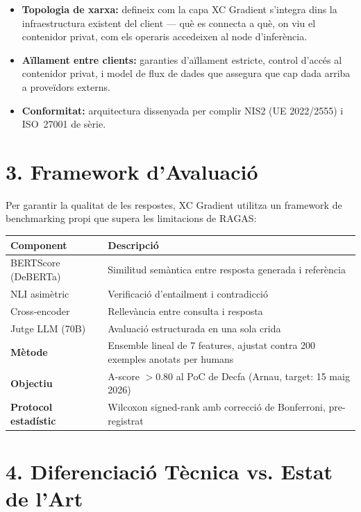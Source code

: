 \documentclass[11pt,a4paper]{article}
\begin{document}
\begin{itemize}[leftmargin=1.5em,itemsep=2pt]
\item \textbf{Topologia de xarxa:} defineix com la capa XC Gradient s'integra dins la infraestructura existent del client --- què es connecta a què, on viu el contenidor privat, com els operaris accedeixen al node d'inferència.
\item \textbf{Aïllament entre clients:} garanties d'aïllament estricte, control d'accés al contenidor privat, i model de flux de dades que assegura que cap dada arriba a proveïdors externs.
\item \textbf{Conformitat:} arquitectura dissenyada per complir NIS2 (UE 2022/2555) i ISO~27001 de sèrie.
\end{itemize}

\section{3. Framework d'Avaluació}

Per garantir la qualitat de les respostes, XC Gradient utilitza un framework de benchmarking propi que supera les limitacions de RAGAS:

\begin{center}
\renewcommand{\arraystretch}{1.2}
\small
\begin{tabularx}{0.92\textwidth}{l X}
\toprule
\textbf{Component} & \textbf{Descripció} \\
\midrule
BERTScore (DeBERTa) & Similitud semàntica entre resposta generada i referència \\
NLI asimètric & Verificació d'entailment i contradicció \\
Cross-encoder & Rellevància entre consulta i resposta \\
Jutge LLM (70B) & Avaluació estructurada en una sola crida \\
\midrule
\textbf{Mètode} & Ensemble lineal de 7 features, ajustat contra 200 exemples anotats per humans \\
\textbf{Objectiu} & A-score $>$0.80 al PoC de Decfa (Arnau, target: 15 maig 2026) \\
\textbf{Protocol estadístic} & Wilcoxon signed-rank amb correcció de Bonferroni, pre-registrat \\
\bottomrule
\end{tabularx}
\end{center}

\section{4. Diferenciació Tècnica vs. Estat de l'Art}
\end{document}
